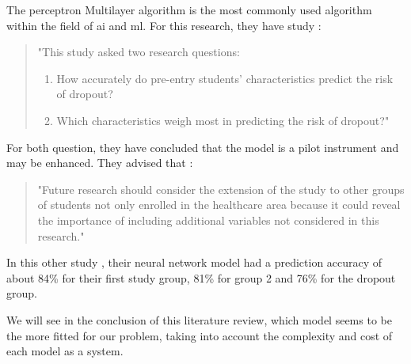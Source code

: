 \documentclass[../../../main.tex]{subfiles}
\begin{document}
The perceptron Multilayer algorithm is the most commonly used algorithm within the field of \acrshort{ai} and \acrshort{ml}.\cite{siri_predicting_2015} For this research, they have study :
\begin{quote}
    "This study asked two research questions: 
    \begin{enumerate}
        \item How accurately do pre-entry students’ characteristics predict the risk of dropout?
        \item Which characteristics weigh most in predicting the risk of dropout?"
    \end{enumerate} 
\end{quote}\cite{siri_predicting_2015}
For both question, they have concluded that the model is a pilot instrument and may be enhanced. They advised that :
\begin{quote}
    "Future research should consider the extension of the study to other groups of students not only enrolled in the healthcare area because it could reveal the importance of including additional variables not considered in this research."
\end{quote}\cite{siri_predicting_2015}

In this other study \cite{siri_predicting_2015}, their neural network model had a prediction accuracy of about 84\% for their first study group, 81\% for group 2 and 76\% for the dropout group. 

We will see in the conclusion of this literature review, which model seems to be the more fitted for our problem, taking into account the complexity and cost of each model as a system.
\end{document}
